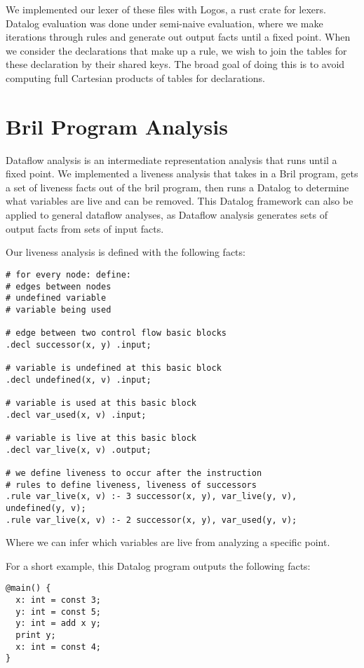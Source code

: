 \documentclass{article}
\begin{document}
We implemented our lexer of these files with Logos, a rust crate for lexers. Datalog evaluation was done under semi-naive evaluation, where we make iterations through rules and generate out output facts until a fixed point. When we consider the declarations that make up a rule, we wish to join the tables for these declaration by their shared keys. The broad goal of doing this is to avoid computing full Cartesian products of tables for declarations.

\section{Bril Program Analysis}
Dataflow analysis is an intermediate representation analysis that runs until a fixed point. We implemented a liveness analysis that takes in a Bril program, gets a set of liveness facts out of the bril program, then runs a Datalog to determine what variables are live and can be removed. This Datalog framework can also be applied to general dataflow analyses, as Dataflow analysis generates sets of output facts from sets of input facts. 

Our liveness analysis is defined with the following facts:
\begin{lstlisting}
# for every node: define:
# edges between nodes
# undefined variable
# variable being used

# edge between two control flow basic blocks
.decl successor(x, y) .input;

# variable is undefined at this basic block
.decl undefined(x, v) .input;

# variable is used at this basic block
.decl var_used(x, v) .input;

# variable is live at this basic block
.decl var_live(x, v) .output;

# we define liveness to occur after the instruction
# rules to define liveness, liveness of successors
.rule var_live(x, v) :- 3 successor(x, y), var_live(y, v), undefined(y, v);
.rule var_live(x, v) :- 2 successor(x, y), var_used(y, v);
\end{lstlisting}

Where we can infer which variables are live from analyzing a specific point. 

For a short example, this Datalog program outputs the following facts:

\begin{lstlisting}
@main() {
  x: int = const 3;
  y: int = const 5;
  y: int = add x y;
  print y;
  x: int = const 4;
}
\end{lstlisting}
\end{document}
